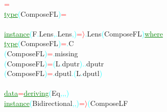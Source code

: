 \textcolor{red}{=}\\\hstab \textcolor{green}{\underline{type}}\hsspace \textcolor{cyan}{(}{\rm{}ComposeFL}\textcolor{cyan}{)}\hsspace \textcolor{red}{=}\\\\\textcolor{green}{\underline{instance}}\hsspace \textcolor{cyan}{(}{\rm{}F}\textcolor{cyan}{.}{\rm{}Lens}\textcolor{cyan}{,}\textcolor{cyan}{.}{\rm{}Lens}\textcolor{cyan}{,}\hsspace \textcolor{red}{\tilde{ }}\textcolor{cyan}{)}\hsspace \textcolor{red}{=\ensuremath{\rangle}}\textcolor{cyan}{.}{\rm{}Lens}\hsspace \textcolor{cyan}{(}{\rm{}ComposeFL}\textcolor{cyan}{)}\hsspace \textcolor{green}{\underline{where}}\\\hstab \textcolor{green}{\underline{type}}\hsspace \textcolor{cyan}{(}{\rm{}ComposeFL}\textcolor{cyan}{)}\hsspace \textcolor{red}{=}\textcolor{cyan}{.}{\rm{}C}\\\hsspace \hsspace \textcolor{cyan}{(}{\rm{}ComposeFL}\textcolor{cyan}{)}\hsspace \textcolor{red}{=}\textcolor{cyan}{.}{\rm{}missing}\\\hsspace \textcolor{cyan}{(}{\rm{}ComposeFL}\textcolor{cyan}{)}\hsspace \textcolor{red}{=}\hsspace \textcolor{cyan}{(}{\rm{}L}\textcolor{cyan}{.}{\rm{}dputr}\textcolor{cyan}{)}\hsspace \textcolor{cyan}{.}\textcolor{cyan}{.}{\rm{}dputr}\\\hsspace \textcolor{cyan}{(}{\rm{}ComposeFL}\textcolor{cyan}{)}\hsspace \textcolor{red}{=}\textcolor{cyan}{.}{\rm{}dputl}\hsspace \textcolor{cyan}{.}\hsspace \textcolor{cyan}{(}{\rm{}L}\textcolor{cyan}{.}{\rm{}dputl}\textcolor{cyan}{)}\\\\\textcolor{green}{\underline{data}}\hsspace \textcolor{red}{=}\hsspace \textcolor{green}{\underline{deriving}}\hsspace \textcolor{cyan}{(}{\rm{}Eq}\textcolor{cyan}{,}\textcolor{cyan}{,}\textcolor{cyan}{,}\textcolor{cyan}{)}\\\textcolor{green}{\underline{instance}}\hsspace \textcolor{cyan}{(}{\rm{}Bidirectional}\textcolor{cyan}{,}\textcolor{cyan}{,}\hsspace \textcolor{red}{\tilde{ }}\textcolor{cyan}{)}\hsspace \textcolor{red}{=\ensuremath{\rangle}}\hsspace \textcolor{cyan}{(}{\rm{}ComposeLF}\hsspace 
